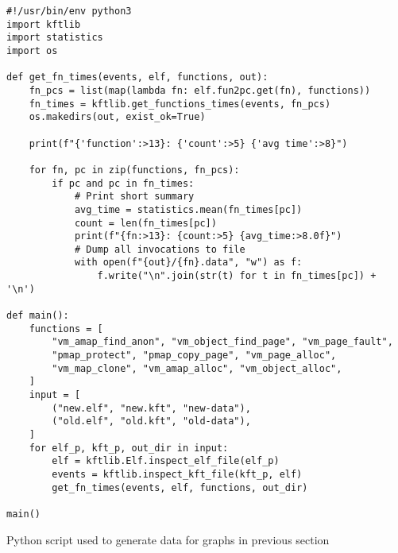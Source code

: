 \begin{listing}[h]
\begin{verbatim}
#!/usr/bin/env python3
import kftlib
import statistics
import os

def get_fn_times(events, elf, functions, out):
    fn_pcs = list(map(lambda fn: elf.fun2pc.get(fn), functions))
    fn_times = kftlib.get_functions_times(events, fn_pcs)
    os.makedirs(out, exist_ok=True)

    print(f"{'function':>13}: {'count':>5} {'avg time':>8}")

    for fn, pc in zip(functions, fn_pcs):
        if pc and pc in fn_times:
            # Print short summary
            avg_time = statistics.mean(fn_times[pc])
            count = len(fn_times[pc])
            print(f"{fn:>13}: {count:>5} {avg_time:>8.0f}")
            # Dump all invocations to file
            with open(f"{out}/{fn}.data", "w") as f:
                f.write("\n".join(str(t) for t in fn_times[pc]) + '\n')

def main():
    functions = [
        "vm_amap_find_anon", "vm_object_find_page", "vm_page_fault",
        "pmap_protect", "pmap_copy_page", "vm_page_alloc",
        "vm_map_clone", "vm_amap_alloc", "vm_object_alloc",
    ]
    input = [
        ("new.elf", "new.kft", "new-data"),
        ("old.elf", "old.kft", "old-data"),
    ]
    for elf_p, kft_p, out_dir in input:
        elf = kftlib.Elf.inspect_elf_file(elf_p)
        events = kftlib.inspect_kft_file(kft_p, elf)
        get_fn_times(events, elf, functions, out_dir)

main()
    \end{verbatim}
  \caption{Python script used to generate data for graphs in previous section}
  \label{impl:kft_script}
\end{listing}

